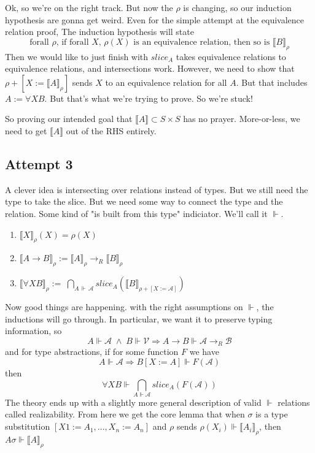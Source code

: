 \documentclass[12pt]{article}
\begin{document}
Ok, so we're on the right track.
But now the $\rho$ is changing, so our induction hypothesis are gonna get weird.
Even for the simple attempt at the equivalence relation proof,
The induction hypothesis will state 
\[
  \text{forall $\rho$, if forall $X$, $\rho(X)$ is an equivalence relation, then so is $\llbracket B \rrbracket_\rho$}
\]
Then we would like to just finish with $slice_A$ takes equivalence relations to equivalence relations, and intersections work.
However, we need to show that $\rho + [X := \llbracket A \rrbracket_\rho]$ sends $X$ to an equivalence relation for all $A$.
But that includes $A := \forall X B$. 
But that's what we're trying to prove.
So we're stuck!

So proving our intended goal that $\llbracket A \rrbracket \subset S \times S$ has no prayer.
More-or-less, we need to get $\llbracket A \rrbracket$ out of the RHS entirely.

\subsection{Attempt 3}
A clever idea is intersecting over relations instead of types. 
But we still need the type to take the slice.
But we need some way to connect the type and the relation.
Some kind of "is built from this type" indiciator. We'll call it $\Vdash$.
\begin{enumerate}
    \item  $\llbracket X \rrbracket_\rho(X) = \rho(X)$
    \item  $\llbracket A \rightarrow B \rrbracket_\rho := \llbracket A \rrbracket_\rho \rightarrow_R \llbracket B \rrbracket_\rho$
    \item  $\llbracket \forall X B \rrbracket_\rho :=\; \bigcap_{A\, \Vdash \,\mathcal{A}} slice_{A}(\llbracket B\rrbracket_{\rho + [X := \mathcal{A}]})$
\end{enumerate}
Now good things are happening.
with the right assumptions on $\Vdash$, the inductions will go through.
In particular, we want it to preserve typing information, so 
\[
  A \Vdash \mathcal{A} \; \land \;  B \Vdash \mathcal{V} \Rightarrow A \rightarrow B \Vdash \mathcal{A} \rightarrow_R \mathcal{B}
\]
and for type abstractions, if for some function $F$ we have 
\[
   A\Vdash \mathcal{A} \Rightarrow B[X := A] \Vdash F(\mathcal{A})
\]
then 
\[
   \forall X B \Vdash \bigcap_{A\Vdash \mathcal{A}} slice_A(F(\mathcal{A}))
\]
The theory ends up with a slightly more general description of valid $\Vdash$ relations called realizability. 
From here we get the core lemma that when $\sigma$ is a type substitution $[X1 := A_1, ..., X_n := A_n]$ and $\rho$ sends $\rho(X_i) \Vdash \llbracket A_i\rrbracket_\rho$, then  $A\sigma \Vdash \llbracket A \rrbracket_\rho $
\end{document}
